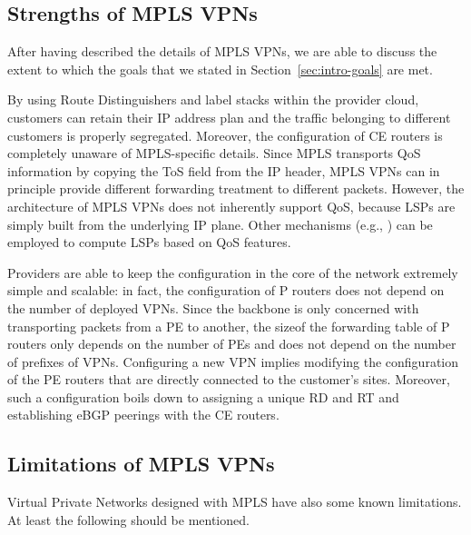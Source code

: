 \documentclass{article}
\begin{document}
\subsection{Strengths of MPLS VPNs}

After having described the details of MPLS VPNs, we are able to discuss the 
extent to which the goals that we stated in Section~\ref{sec:intro-goals} are 
met.

By using Route Distinguishers and label stacks within the provider cloud, 
customers can retain their IP address plan and the traffic belonging to 
different customers is properly segregated. Moreover, the configuration of CE 
routers is completely unaware of MPLS-specific details. Since MPLS transports 
QoS information by copying the ToS field from the IP header, MPLS VPNs can in 
principle provide different forwarding treatment to different packets. However, 
the architecture of MPLS VPNs does not inherently support QoS, because LSPs are 
simply built from the underlying IP plane. Other mechanisms (e.g., 
\cite{rfc3209}) can be employed to compute LSPs based on QoS features. 

Providers are able to keep the configuration in the core of the network 
extremely simple and scalable: in fact, the configuration of P routers does not 
depend on the number of deployed VPNs. Since the backbone is only concerned with 
transporting packets from a PE to another, the sizeof the forwarding table of P routers only depends on the number of PEs and does not depend on the number of prefixes of VPNs.
Configuring a new VPN implies 
modifying the configuration of the PE routers that are directly connected to the 
customer's sites. Moreover, such a configuration boils down to assigning a 
unique RD and RT and establishing eBGP peerings with the CE routers.

\subsection{Limitations of MPLS VPNs}


Virtual Private Networks designed with MPLS have also some known limitations. 
At least the following should be mentioned.
\end{document}
